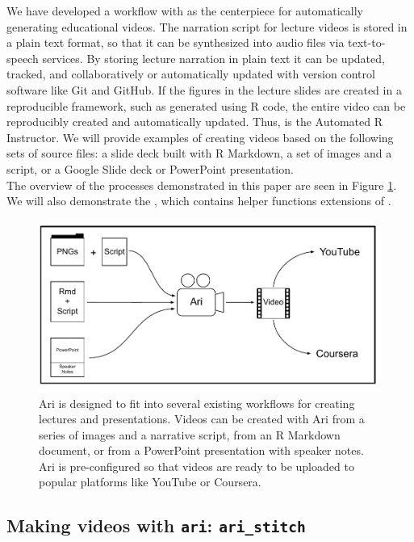We have developed a workflow with  as the centerpiece for
automatically generating educational videos. The narration script for
lecture videos is stored in a plain text format, so that it can be
synthesized into audio files via text-to-speech services. By storing
lecture narration in plain text it can be updated, tracked, and
collaboratively or automatically updated with version control software
like Git and GitHub. If the figures in the lecture slides are created in
a reproducible framework, such as generated using R code, the entire
video can be reproducibly created and automatically updated. Thus,
 is the Automated R Instructor. We will provide examples of
creating videos based on the following sets of source files: a slide
deck built with R Markdown, a set of images and a script, or a Google
Slide deck or PowerPoint presentation.\\
The overview of the processes demonstrated in this paper are seen in
Figure \ref{fig:fig1}. We will also demonstrate the ,
which contains helper functions extensions of .

\begin{Schunk}
\begin{figure}
\includegraphics[width=1\linewidth]{Figure-1-Ari-pdf} \caption[Ari is designed to fit into several existing workflows for creating lectures and presentations]{Ari is designed to fit into several existing workflows for creating lectures and presentations. Videos can be created with Ari from a series of images and a narrative script, from an R Markdown document, or from a PowerPoint presentation with speaker notes. Ari is pre-configured so that videos are ready to be uploaded to popular platforms like YouTube or Coursera.}\label{fig:fig1}
\end{figure}
\end{Schunk}

\hypertarget{making-videos-with-ari-ari_stitch}{%
\subsection{\texorpdfstring{Making videos with \texttt{ari}:
\texttt{ari\_stitch}}{Making videos with ari: ari\_stitch}}\label{making-videos-with-ari-ari_stitch}}


